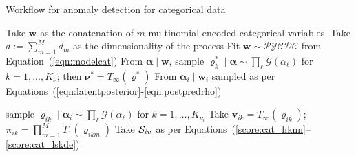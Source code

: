 \begin{algorithm}[htb]
    \caption{Workflow for anomaly detection for categorical data}\label{alg:adcat}
    \begin{algorithmic}[1]
        \State Take $\bm{w}$ as the conatenation of $m$ multinomial-encoded categorical variables.
        \State Take $d := \sum_{m = 1}^M d_m$ as the dimensionality of the process
        \State Fit $\bm{w}\sim\mathcal{PYCDC}$ from Equation~(\ref{eqn:modelcat})
        \State From $\bm{\alpha}\mid\bm{w}$, sample $\bm{\varrho}_k^*\mid\bm{\alpha}\sim \prod_{\ell}\mathcal{G}(\alpha_{\ell})$ for $k = 1,\ldots,K_{\nu}$; then $\bm{\nu}^* = T_{\infty}(\bm{\varrho}^*)$
        \State From $\bm{\alpha}_i\mid\bm{w}_i$ sampled as per Equations~(\ref{eqn:latentposterior}-\ref{eqn:postpredrho})
        
        sample $\bm{\varrho}_{ik}\mid\bm{\alpha}_{i}\sim\prod_{\ell}\mathcal{G}(\alpha_{\ell})$ for $k = 1,\ldots,K_{\nu_i}$
        \State Take $\bm{v}_{ik} = T_{\infty}(\bm{\varrho}_{ik})$;\hspace{0.15cm}
            $\bm{\pi}_{ik} = \prod_{m = 1}^MT_{1}(\bm{\varrho}_{ikm})$
        \State Take $\mathcal{S}_{i\bm{v}}$ as per Equations~(\ref{score:cat_hknn}--\ref{score:cat_lskde})
    \end{algorithmic}
\end{algorithm}




